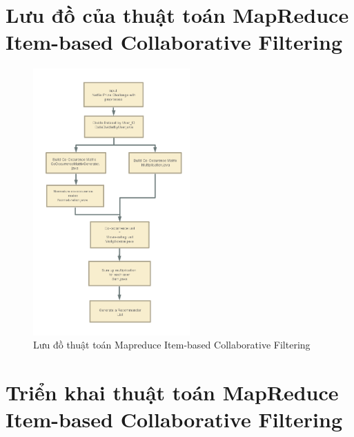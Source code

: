 \documentclass{report}
\begin{document}
\section{Lưu đồ của thuật toán MapReduce Item-based Collaborative Filtering}
\begin{figure}[h]
    \centering
    \includegraphics[width=6cm]{images/RecommenderSystem.png}
    \caption{Lưu đồ thuật toán Mapreduce Item-based Collaborative Filtering}
\end{figure}
\section{Triển khai thuật toán MapReduce Item-based Collaborative Filtering}
\end{document}
